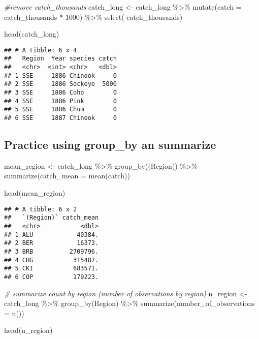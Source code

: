 \documentclass[
]{article}
\newenvironment{Shaded}{\begin{snugshade}}{\end{snugshade}}
\newcommand{\AttributeTok}[1]{\textcolor[rgb]{0.77,0.63,0.00}{#1}}
\newcommand{\CommentTok}[1]{\textcolor[rgb]{0.56,0.35,0.01}{\textit{#1}}}
\newcommand{\DecValTok}[1]{\textcolor[rgb]{0.00,0.00,0.81}{#1}}
\newcommand{\FunctionTok}[1]{\textcolor[rgb]{0.00,0.00,0.00}{#1}}
\newcommand{\NormalTok}[1]{#1}
\newcommand{\OtherTok}[1]{\textcolor[rgb]{0.56,0.35,0.01}{#1}}
\newcommand{\SpecialCharTok}[1]{\textcolor[rgb]{0.00,0.00,0.00}{#1}}
\begin{document}
\begin{Shaded}
\begin{Highlighting}[]
\CommentTok{\#remove catch\_thousands}
\NormalTok{catch\_long }\OtherTok{\textless{}{-}}\NormalTok{ catch\_long }\SpecialCharTok{\%\textgreater{}\%}
  \FunctionTok{mutate}\NormalTok{(}\AttributeTok{catch =}\NormalTok{ catch\_thousands }\SpecialCharTok{*} \DecValTok{1000}\NormalTok{) }\SpecialCharTok{\%\textgreater{}\%}
  \FunctionTok{select}\NormalTok{(}\SpecialCharTok{{-}}\NormalTok{catch\_thousands)}

\FunctionTok{head}\NormalTok{(catch\_long)}
\end{Highlighting}
\end{Shaded}

\begin{verbatim}
## # A tibble: 6 x 4
##   Region  Year species catch
##   <chr>  <int> <chr>   <dbl>
## 1 SSE     1886 Chinook     0
## 2 SSE     1886 Sockeye  5000
## 3 SSE     1886 Coho        0
## 4 SSE     1886 Pink        0
## 5 SSE     1886 Chum        0
## 6 SSE     1887 Chinook     0
\end{verbatim}

\hypertarget{practice-using-group_by-an-summarize}{%
\subsection{Practice using group\_by an
summarize}\label{practice-using-group_by-an-summarize}}

\begin{Shaded}
\begin{Highlighting}[]
\NormalTok{mean\_region }\OtherTok{\textless{}{-}}\NormalTok{ catch\_long }\SpecialCharTok{\%\textgreater{}\%}
  \FunctionTok{group\_by}\NormalTok{((Region)) }\SpecialCharTok{\%\textgreater{}\%}
  \FunctionTok{summarize}\NormalTok{(}\AttributeTok{catch\_mean =} \FunctionTok{mean}\NormalTok{(catch))}

\FunctionTok{head}\NormalTok{(mean\_region)}
\end{Highlighting}
\end{Shaded}

\begin{verbatim}
## # A tibble: 6 x 2
##   `(Region)` catch_mean
##   <chr>           <dbl>
## 1 ALU            40384.
## 2 BER            16373.
## 3 BRB          2709796.
## 4 CHG           315487.
## 5 CKI           683571.
## 6 COP           179223.
\end{verbatim}

\begin{Shaded}
\begin{Highlighting}[]
\CommentTok{\# summarize count by region (number of observations by region)}
\NormalTok{n\_region }\OtherTok{\textless{}{-}}\NormalTok{ catch\_long }\SpecialCharTok{\%\textgreater{}\%} 
  \FunctionTok{group\_by}\NormalTok{(Region) }\SpecialCharTok{\%\textgreater{}\%}
  \FunctionTok{summarize}\NormalTok{(}\AttributeTok{number\_of\_observations =} \FunctionTok{n}\NormalTok{())}

\FunctionTok{head}\NormalTok{(n\_region)}
\end{Highlighting}
\end{Shaded}
\end{document}
